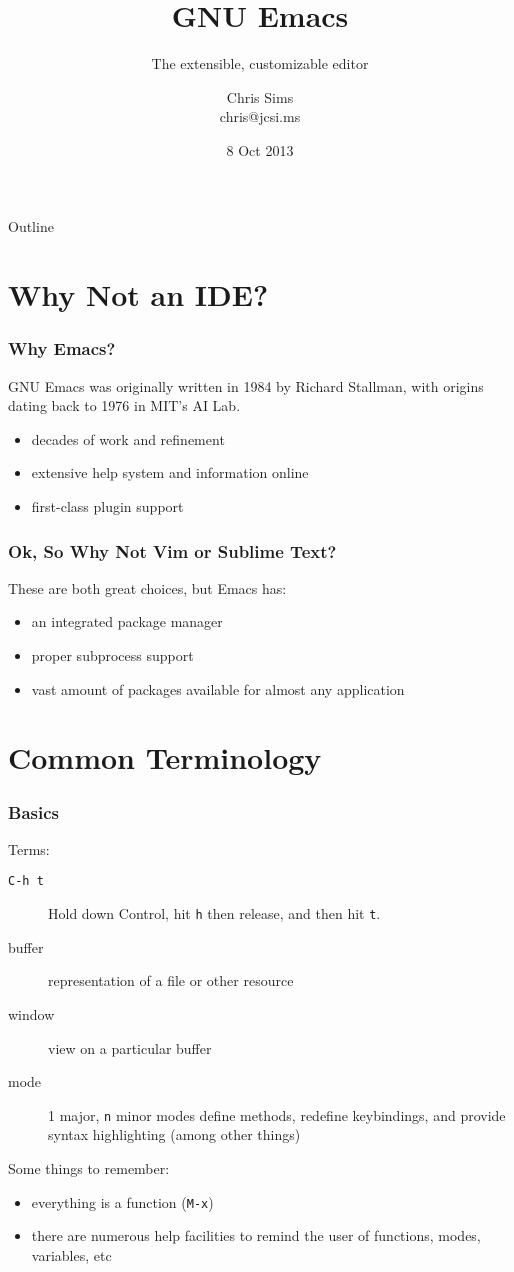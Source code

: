 \documentclass{beamer}
\title{GNU Emacs}
\subtitle{The extensible, customizable editor}
\author{Chris Sims \\ chris@jcsi.ms}
\date{8 Oct 2013}
\begin{document}
\lstset{language=[LaTeX]TeX}
\frame{\titlepage}

\begin{frame}{Outline}
  \tableofcontents
\end{frame}


\section{Why Not an IDE?}
\begin{frame}
  \frametitle{Why Emacs?}  GNU Emacs was originally written in 1984 by
  Richard Stallman, with origins dating back to 1976 in MIT's AI Lab.
  \begin{itemize}
  \item decades of work and refinement
  \item extensive help system and information online
  \item first-class plugin support
  \end{itemize}
\end{frame}

\begin{frame}
  \frametitle{Ok, So Why Not Vim or Sublime Text?}

  These are both great choices, but Emacs has:
  \begin{itemize}
  \item an integrated package manager
  \item proper subprocess support
  \item vast amount of packages available for almost any application
  \end{itemize}

\end{frame}

\section{Common Terminology}
\begin{frame}
  \frametitle{Basics}
  Terms:
  \begin{description}
  \item[\texttt{C-h t}] Hold down Control, hit {\tt h} then release, and then
    hit {\tt t}.
  \item[buffer] representation of a file or other resource
  \item[window] view on a particular buffer
  \item[mode] 1 major, {\tt n} minor modes define methods,
    redefine keybindings, and provide syntax highlighting (among
    other things)
  \end{description}
  Some things to remember:
  \begin{itemize}
  \item everything is a function ({\tt M-x})
  \item there are numerous help facilities to remind the user of functions,
    modes, variables, etc
  \end{itemize}
\end{frame}
\end{document}
